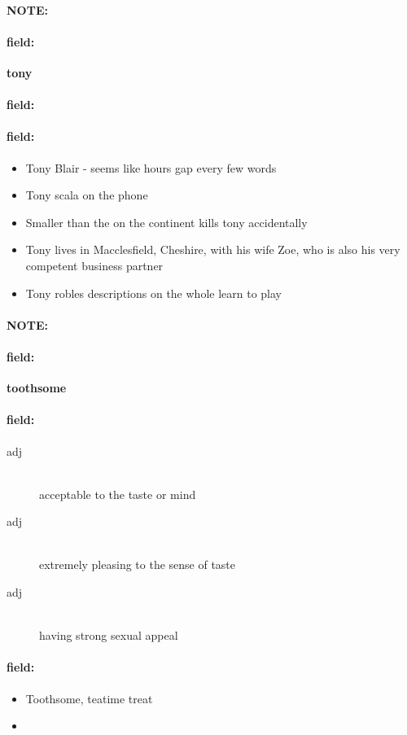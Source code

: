 \documentclass[12pt]{article}
\newenvironment{note}{\paragraph{NOTE:}}{}
\newenvironment{field}{\paragraph{field:}}{}
\begin{document}
\begin{note}
\begin{field}
\textbf{\large tony}
\end{field}


\begin{field}
\end{field}

\begin{field}
\begin{itemize}
\item Tony Blair - seems like hours gap every few words
\item Tony scala on the phone
\item Smaller than the on the continent kills tony accidentally
\item Tony lives in Macclesfield, Cheshire, with his wife Zoe, who is also his very competent business partner
\item Tony robles descriptions on the whole learn to play
\end{itemize}
\end{field}
\end{note}
\begin{note}
\begin{field}
\textbf{\large toothsome}
\end{field}


\begin{field}
\begin{description}
\item[adj] \hfill \\ 
acceptable to the taste or mind

\item[adj] \hfill \\ 
extremely pleasing to the sense of taste

\item[adj] \hfill \\ 
having strong sexual appeal

\end{description}
\end{field}

\begin{field}
\begin{itemize}
\item Toothsome, teatime treat
\item 
\end{itemize}
\end{field}
\end{note}
\end{document}
